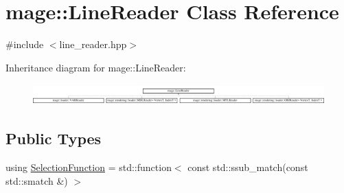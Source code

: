 \hypertarget{classmage_1_1_line_reader}{}\section{mage\+:\+:Line\+Reader Class Reference}
\label{classmage_1_1_line_reader}


{\ttfamily \#include $<$line\+\_\+reader.\+hpp$>$}

Inheritance diagram for mage\+:\+:Line\+Reader\+:\begin{figure}[H]
\begin{center}
\leavevmode
\includegraphics[height=0.821114cm]{classmage_1_1_line_reader}
\end{center}
\end{figure}
\subsection*{Public Types}
\begin{DoxyCompactItemize}
\item 
using \mbox{\hyperlink{classmage_1_1_line_reader_a17bbae61a3ce30bdb251d6c76e1a4522}{Selection\+Function}} = std\+::function$<$ const std\+::ssub\+\_\+match(const std\+::smatch \&) $>$
\end{DoxyCompactItemize}
